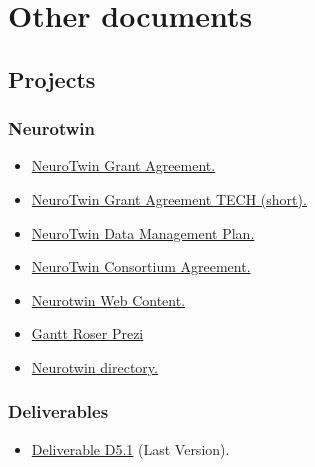 \section{Other documents}
\subsection{Projects}
\subsubsection{Neurotwin}
\begin{itemize}
 \item \href{https://www.dropbox.com/home/998%20-%20neurotwin.eu%20repository/01%20-%20Neurotwin%20Starter%20Kit?preview=Grant+Agreement-101017716-Neurotwin.pdf}{NeuroTwin Grant Agreement.}
 \item \href{https://www.dropbox.com/home/998%20-%20neurotwin.eu%20repository/01%20-%20Neurotwin%20Starter%20Kit?preview=Grant+Agreement-101017716-Neurotwin+TECH.pdf}{NeuroTwin Grant Agreement TECH (short).}
 \item \href{https://www.dropbox.com/home/009%20-%20Neuroelectrics%20Research%20WORK%20AREA/002%20-%20Neurotwin/101%20-%20Neurotwin%20Data%20Management%20Plan/from%20Luminous}{NeuroTwin Data Management Plan.}
 \item \href{https://www.dropbox.com/home/009%20-%20Neuroelectrics%20Research%20WORK%20AREA/002%20-%20Neurotwin/102%20-%20Neurotwin%20Consortium%20Agreement}{NeuroTwin Consortium Agreement.}
 \item \href{https://docs.google.com/document/d/1lEjSbhkZhggJMzSBceajwg3VIAWfD3EKFGuKd5JcIPM/edit}{Neurotwin Web Content.}
 \item \href{https://prezi.com/view/A4DTYXXpVsNqS1TuUwdb/}{Gantt Roser Prezi}
 \item \href{https://docs.google.com/spreadsheets/d/1TWLecaDlCCRT2Sj8MxZY4WaqSHaYyOZjTOToTy9Fnog/edit#gid=0}{Neurotwin directory.}
\end{itemize}
\begin{subsubsub}
\subsubsection{Deliverables}
\begin{itemize}
    \item \href{https://www.dropbox.com/home/998%20-%20neurotwin.eu%20repository/05%20-%20Deliverables?preview=NEUROTWIN+Deliverable+-+D5.1+Quality+Guide_v1.7_CG.docx}{Deliverable D5.1} (Last Version).
\end{itemize}
\end{subsubsub}

